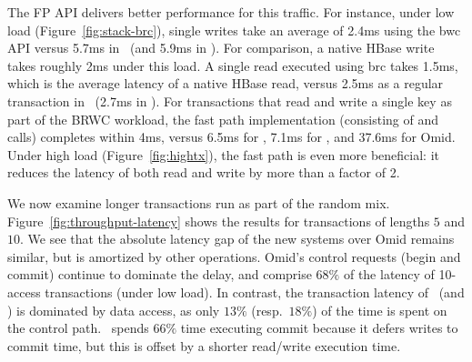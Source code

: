 The FP API delivers better performance for this traffic. For instance, under low load (Figure~\ref{fig:stack-brc}),
single writes take an average of 2.4ms using 
the {\code bwc} API versus 5.7ms in \sysll\ (and 5.9ms in \syspc). 
For comparison, a native HBase write takes roughly 2ms under this load.
A single read executed using {\code brc} takes 1.5ms, which is the average latency of a native HBase read,
versus 2.5ms as a regular transaction in \sysll\ (2.7ms in \syspc). 
For transactions that read and write a single key as part of the BRWC workload, 
the fast path implementation (consisting of  and  calls) completes within 4ms,
versus 6.5ms for  \sysll, 7.1ms for \syspc, and 37.6ms for Omid. 
%
Under high load (Figure~\ref{fig:hightx}), the fast path is even more beneficial: it reduces the latency of 
both read and write by more than a factor of 2. 



We now examine longer transactions run as part of the random mix.
Figure~\ref{fig:throughput-latency} shows the results for transactions of lengths $5$ and $10$.
We see that the absolute latency gap of the new systems over Omid remains similar, but is amortized 
by other operations. Omid's control requests (begin and commit) continue to 
dominate the delay, and comprise $68\%$ of the latency of 10-access transactions (under low load).
In contrast, the transaction latency of \sysll\ (and \sys) is dominated by data access, 
as only $13\%$ (resp.~$18\%$)  of the time is spent on the control path. 
\syspc\ spends $66\%$ time executing commit  because it defers writes to commit time,
but this is offset by a shorter read/write execution time.

